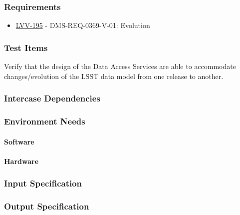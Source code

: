 \subsubsection{Requirements}
\begin{itemize}
\item \href{https://jira.lsstcorp.org/browse/LVV-195}{LVV-195} - DMS-REQ-0369-V-01: Evolution
\end{itemize}

\subsubsection{Test Items}
Verify that the design of the Data Access Services are able to
accommodate changes/evolution of the LSST data model from one release to
another.



\subsubsection{Intercase Dependencies}

\subsubsection{Environment Needs}

\paragraph{Software}

\paragraph{Hardware}

\subsubsection{Input Specification}

\subsubsection{Output Specification}

